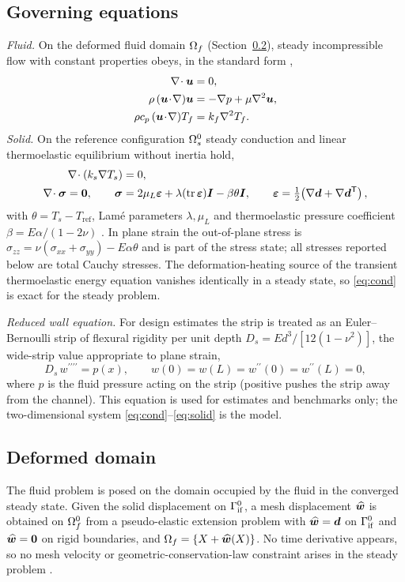 \subsection{Governing equations}
\label{sec:governing}
\emph{Fluid.} On the deformed fluid domain $\Omega_f$ (Section~\ref{sec:ale}), steady incompressible
flow with constant properties obeys, in the standard form \citep{bird1960transport},
\begin{align}
\nabla\!\cdot\bm{u}&=0, \label{eq:cont}\\
\rho\,(\bm{u}\!\cdot\!\nabla)\bm{u}&=-\nabla p+\mu\nabla^2\bm{u}, \label{eq:mom}\\
\rho c_p\,(\bm{u}\!\cdot\!\nabla)T_f&=k_f\nabla^2T_f. \label{eq:fe}
\end{align}
\emph{Solid.} On the reference configuration $\Omega_s^0$ steady conduction \citep{carslaw1947conduction}
and linear thermoelastic equilibrium without inertia hold,
\begin{align}
\nabla\!\cdot(k_s\nabla T_s)&=0, \label{eq:cond}\\
\nabla\!\cdot\bm{\sigma}=\bm 0,\qquad
\bm{\sigma}&=2\mu_L\bm{\varepsilon}+\lambda(\operatorname{tr}\bm{\varepsilon})\bm{I}-\beta\theta\bm{I},\qquad
\bm{\varepsilon}=\tfrac12\!\left(\nabla\bm{d}+\nabla\bm{d}^{\mathsf T}\right), \label{eq:solid}
\end{align}
with $\theta=T_s-T_{\mathrm{ref}}$, Lam\'e parameters $\lambda,\mu_L$ and thermoelastic pressure
coefficient $\beta=E\alpha/(1-2\nu)$ \citep{boley1960theory}. In plane strain the out-of-plane
stress is $\sigma_{zz}=\nu(\sigma_{xx}+\sigma_{yy})-E\alpha\theta$ and is part of the stress state; all
stresses reported below are total Cauchy stresses. The deformation-heating source of the transient
thermoelastic energy equation vanishes identically in a steady state, so \eqref{eq:cond} is exact
for the steady problem.

\emph{Reduced wall equation.} For design estimates the strip is treated as an Euler--Bernoulli strip
of flexural rigidity per unit depth $D_s=Ed^3/[12(1-\nu^2)]$, the wide-strip value appropriate to plane strain,
\begin{equation}
D_s\,w^{\prime\prime\prime\prime}=p(x),\qquad w(0)=w(L)=w^{\prime\prime}(0)=w^{\prime\prime}(L)=0,
\label{eq:beam}
\end{equation}
where $p$ is the fluid pressure acting on the strip (positive pushes the strip away from the channel).
This equation is used for estimates and benchmarks only; the two-dimensional system
\eqref{eq:cond}--\eqref{eq:solid} is the model.

\subsection{Deformed domain}
\label{sec:ale}
The fluid problem is posed on the domain occupied by the fluid in the converged steady state. Given
the solid displacement on $\Gamma_{\mathrm{if}}^0$, a mesh displacement $\widehat{\bm{w}}$ is obtained on
$\Omega_f^0$ from a pseudo-elastic extension problem with $\widehat{\bm{w}}=\bm{d}$ on $\Gamma_{\mathrm{if}}^0$ and
$\widehat{\bm{w}}=\bm 0$ on rigid boundaries, and $\Omega_f=\{X+\widehat{\bm{w}}(X)\}$. No time derivative appears, so no mesh
velocity or geometric-conservation-law constraint arises in the steady problem
\citep{lesoinne1996geometric}.


